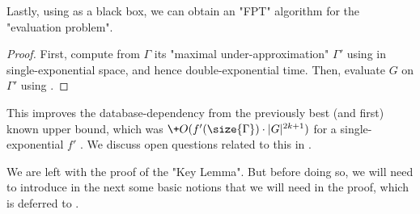 Lastly, using  as a black box, we can obtain an "FPT" algorithm
for the "evaluation problem".
\fptEvalBoundedSemTreeWidth
\begin{proof}
	First, compute from $\Gamma$ its "maximal under-approximation" $\Gamma'$ using
	in single-exponential space, and hence double-exponential time.
	Then, evaluate $G$ on $\Gamma'$ using .
\end{proof}
This improves the database-dependency from the previously best (and first) known upper bound, which was $\+O(f'(\size{\Gamma})\cdot |G|^{2k+1})$ for a single-exponential $f'$ \cite[Theorem IV.11 \& Lemma IV.13]{RomeroBarceloVardi2017Homomorphism}.
We discuss open questions related to this
in .


We are left with the proof of the "Key Lemma". But before doing so, we will need to introduce in the next  some basic notions that we will need in the proof, which is deferred to .